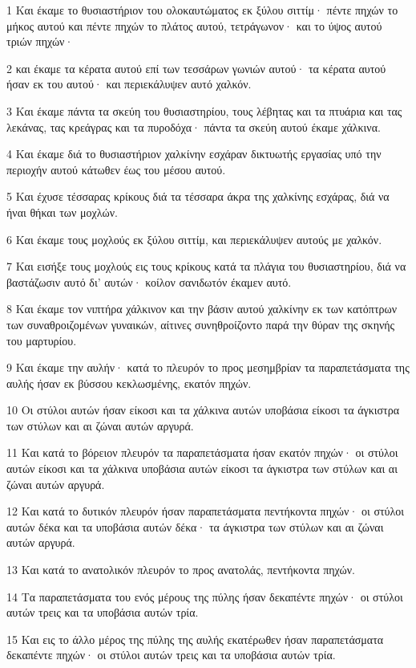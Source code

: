 \par 1 Και έκαμε το θυσιαστήριον του ολοκαυτώματος εκ ξύλου σιττίμ· πέντε πηχών το μήκος αυτού και πέντε πηχών το πλάτος αυτού, τετράγωνον· και το ύψος αυτού τριών πηχών·
\par 2 και έκαμε τα κέρατα αυτού επί των τεσσάρων γωνιών αυτού· τα κέρατα αυτού ήσαν εκ του αυτού· και περιεκάλυψεν αυτό χαλκόν.
\par 3 Και έκαμε πάντα τα σκεύη του θυσιαστηρίου, τους λέβητας και τα πτυάρια και τας λεκάνας, τας κρεάγρας και τα πυροδόχα· πάντα τα σκεύη αυτού έκαμε χάλκινα.
\par 4 Και έκαμε διά το θυσιαστήριον χαλκίνην εσχάραν δικτυωτής εργασίας υπό την περιοχήν αυτού κάτωθεν έως του μέσου αυτού.
\par 5 Και έχυσε τέσσαρας κρίκους διά τα τέσσαρα άκρα της χαλκίνης εσχάρας, διά να ήναι θήκαι των μοχλών.
\par 6 Και έκαμε τους μοχλούς εκ ξύλου σιττίμ, και περιεκάλυψεν αυτούς με χαλκόν.
\par 7 Και εισήξε τους μοχλούς εις τους κρίκους κατά τα πλάγια του θυσιαστηρίου, διά να βαστάζωσιν αυτό δι' αυτών· κοίλον σανιδωτόν έκαμεν αυτό.
\par 8 Και έκαμε τον νιπτήρα χάλκινον και την βάσιν αυτού χαλκίνην εκ των κατόπτρων των συναθροιζομένων γυναικών, αίτινες συνηθροίζοντο παρά την θύραν της σκηνής του μαρτυρίου.
\par 9 Και έκαμε την αυλήν· κατά το πλευρόν το προς μεσημβρίαν τα παραπετάσματα της αυλής ήσαν εκ βύσσου κεκλωσμένης, εκατόν πηχών.
\par 10 Οι στύλοι αυτών ήσαν είκοσι και τα χάλκινα αυτών υποβάσια είκοσι τα άγκιστρα των στύλων και αι ζώναι αυτών αργυρά.
\par 11 Και κατά το βόρειον πλευρόν τα παραπετάσματα ήσαν εκατόν πηχών· οι στύλοι αυτών είκοσι και τα χάλκινα υποβάσια αυτών είκοσι τα άγκιστρα των στύλων και αι ζώναι αυτών αργυρά.
\par 12 Και κατά το δυτικόν πλευρόν ήσαν παραπετάσματα πεντήκοντα πηχών· οι στύλοι αυτών δέκα και τα υποβάσια αυτών δέκα· τα άγκιστρα των στύλων και αι ζώναι αυτών αργυρά.
\par 13 Και κατά το ανατολικόν πλευρόν το προς ανατολάς, πεντήκοντα πηχών.
\par 14 Τα παραπετάσματα του ενός μέρους της πύλης ήσαν δεκαπέντε πηχών· οι στύλοι αυτών τρεις και τα υποβάσια αυτών τρία.
\par 15 Και εις το άλλο μέρος της πύλης της αυλής εκατέρωθεν ήσαν παραπετάσματα δεκαπέντε πηχών· οι στύλοι αυτών τρεις και τα υποβάσια αυτών τρία.

